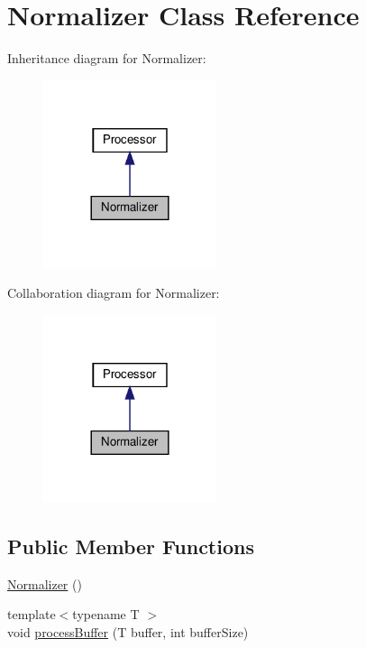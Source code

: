 \hypertarget{classNormalizer}{}\section{Normalizer Class Reference}
\label{classNormalizer}


Inheritance diagram for Normalizer\+:
\nopagebreak
\begin{figure}[H]
\begin{center}
\leavevmode
\includegraphics[width=144pt]{dd/d2d/classNormalizer__inherit__graph}
\end{center}
\end{figure}


Collaboration diagram for Normalizer\+:
\nopagebreak
\begin{figure}[H]
\begin{center}
\leavevmode
\includegraphics[width=144pt]{d9/da8/classNormalizer__coll__graph}
\end{center}
\end{figure}
\subsection*{Public Member Functions}
\begin{DoxyCompactItemize}
\item 
\hyperlink{classNormalizer_af576151323854ff0d4d7e37255c397d1}{Normalizer} ()
\item 
{\footnotesize template$<$typename T $>$ }\\void \hyperlink{classNormalizer_aaef27fc4d06b2d51a1c17e349ca9ab85}{process\+Buffer} (T buffer, int buffer\+Size)
\end{DoxyCompactItemize}


